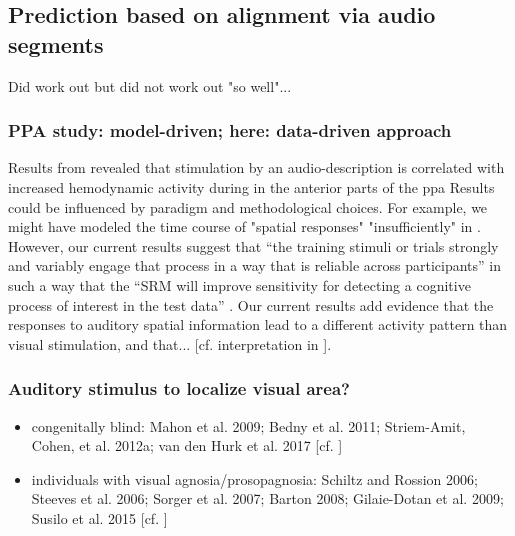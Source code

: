 \subsection{Prediction based on alignment via audio segments}

Did work out but did not work out "so well"...


\subsubsection{PPA study: model-driven; here: data-driven approach}
%
Results from \citet{haeusler2022processing} revealed that stimulation by an
audio-description is correlated with increased hemodynamic activity during in
the anterior parts of the \ac{ppa}
%
Results could be influenced by paradigm and methodological choices.
%
For example, we might have modeled the time course of "spatial responses"
"insufficiently" in \citep{haeusler2022processing}.
%
However, our current results suggest that ``the training stimuli or trials
strongly and variably engage that process in a way that is reliable across
participants'' in such a way that the ``SRM will improve sensitivity for
detecting a cognitive process of interest in the test data''
\citep{cohen2017computational}.
%
Our current results add evidence that the responses to auditory spatial
information lead to a different activity pattern than visual stimulation, and
that... [cf. interpretation in \citet{haeusler2022processing}].



\subsubsection{Auditory stimulus to localize visual area?}



\begin{itemize}

\item congenitally blind:
    Mahon et al. 2009;
    Bedny et al. 2011;
    Striem-Amit, Cohen, et al. 2012a;
    van den Hurk et al. 2017
    [cf. \citet{rosenke2021probabilistic}]

\item individuals with visual agnosia/prosopagnosia:
    Schiltz and Rossion 2006;
    Steeves et al. 2006;
    Sorger et al. 2007;
    Barton 2008;
    Gilaie-Dotan et al. 2009;
    Susilo et al. 2015
    [cf. \citet{rosenke2021probabilistic}]

\end{itemize}



